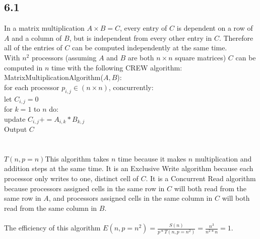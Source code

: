 \documentclass[letterpaper,notitlepage,twoside]{article}
\newcommand\tab[1][1cm]{\hspace*{#1}} %
\begin{document}
\subsection*{6.1}
In a matrix multiplication $A \times B = C$, every entry of $C$ is dependent on a row of $A$ and a column of $B$, but is independent from every other entry in $C$. Therefore all of the entries of $C$ can be computed independently at the same time.\\
With $n^2$ processors (assuming $A$ and $B$ are both $n \times n$ square matrices) $C$ can be computed in $n$ time with the following CREW algorithm:\\
MatrixMultiplicationAlgorithm($A, B$):\\
\tab for each processor $p_{i, j} \in (n \times n)$, concurrently:\\
\tab\tab let $C_{i, j} = 0$\\
\tab\tab for $k = 1$ to $n$ do: \\
\tab\tab\tab update $C_{i, j} += A_{i, k} * B_{k, j}$\\
\tab Output $C$\\
\\\\
$T(n, p=n)$This algorithm takes $n$ time because it makes $n$ multiplication and addition steps at the same time. It is an Exclusive Write algorithm because each processor only writes to one, distinct cell of $C$. It is a Concurrent Read algorithm because processors assigned cells in the same row in $C$ will both read from the same row in $A$, and processors assigned cells in the same column in $C$ will both read from the same column in $B$.
\\\\
The efficiency of this algorithm $E(n, p = n^2) = \frac{S(n)}{p * T(n, p = n^2)} = \frac{n^3}{n^2 * n} = 1$.
\end{document}
